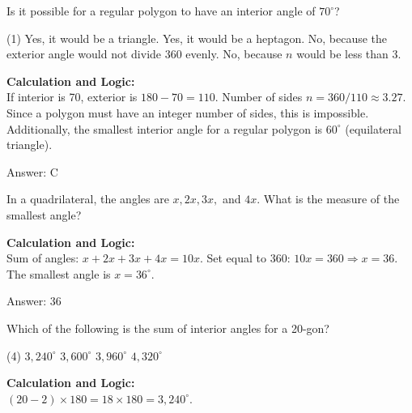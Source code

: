 \documentclass[11pt,paper=a4,answers]{exam}
\begin{document}
\begin{questions}
\question
Is it possible for a regular polygon to have an interior angle of $70^\circ$?
\begin{tasks}(1)
    \task Yes, it would be a triangle.
    \task Yes, it would be a heptagon.
    \task No, because the exterior angle would not divide 360 evenly.
    \task No, because $n$ would be less than 3.
\end{tasks}

\begin{solution}
\textbf{Calculation and Logic:} \\
If interior is 70, exterior is $180 - 70 = 110$. Number of sides $n = 360 / 110 \approx 3.27$. Since a polygon must have an integer number of sides, this is impossible. Additionally, the smallest interior angle for a regular polygon is $60^\circ$ (equilateral triangle).

\vspace{30pt}

Answer: \colorbox{yellow!100}{C}
\end{solution}

\vspace{60pt}

\question
In a quadrilateral, the angles are $x, 2x, 3x,$ and $4x$. What is the measure of the smallest angle?

\begin{solution}
\textbf{Calculation and Logic:} \\
Sum of angles: $x + 2x + 3x + 4x = 10x$. Set equal to 360: $10x = 360 \Rightarrow x = 36$. The smallest angle is $x = 36^\circ$.

\vspace{30pt}

Answer: \colorbox{yellow!100}{36}
\end{solution}

\vspace{60pt}

\question
Which of the following is the sum of interior angles for a 20-gon?
\begin{tasks}(4)
    \task $3,240^\circ$
    \task $3,600^\circ$
    \task $3,960^\circ$
    \task $4,320^\circ$
\end{tasks}

\begin{solution}
\textbf{Calculation and Logic:} \\
$(20 - 2) \times 180 = 18 \times 180 = 3,240^\circ$.


\end{solution}
\end{questions}
\end{document}
